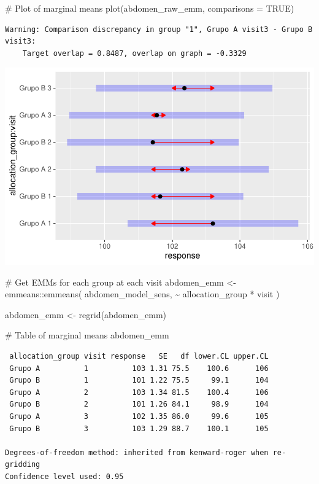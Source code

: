 \documentclass[
  letterpaper,
  DIV=11,
  numbers=noendperiod]{scrartcl}
\newenvironment{Shaded}{\begin{snugshade}}{\end{snugshade}}
\newcommand{\AttributeTok}[1]{\textcolor[rgb]{0.40,0.45,0.13}{#1}}
\newcommand{\CommentTok}[1]{\textcolor[rgb]{0.37,0.37,0.37}{#1}}
\newcommand{\ConstantTok}[1]{\textcolor[rgb]{0.56,0.35,0.01}{#1}}
\newcommand{\FunctionTok}[1]{\textcolor[rgb]{0.28,0.35,0.67}{#1}}
\newcommand{\NormalTok}[1]{\textcolor[rgb]{0.00,0.23,0.31}{#1}}
\newcommand{\OtherTok}[1]{\textcolor[rgb]{0.00,0.23,0.31}{#1}}
\newcommand{\SpecialCharTok}[1]{\textcolor[rgb]{0.37,0.37,0.37}{#1}}
\begin{document}
\begin{Shaded}
\begin{Highlighting}[]
\CommentTok{\# Plot of marginal means}
\FunctionTok{plot}\NormalTok{(abdomen\_raw\_emm, }\AttributeTok{comparisons =} \ConstantTok{TRUE}\NormalTok{)}
\end{Highlighting}
\end{Shaded}

\begin{verbatim}
Warning: Comparison discrepancy in group "1", Grupo A visit3 - Grupo B visit3:
    Target overlap = 0.8487, overlap on graph = -0.3329
\end{verbatim}

\includegraphics{Outcomes_V1V2V3_files/figure-pdf/labs_abdomen_raw_emm-1.pdf}

\begin{Shaded}
\begin{Highlighting}[]
\CommentTok{\# Get EMMs for each group at each visit}
\NormalTok{abdomen\_emm }\OtherTok{\textless{}{-}}\NormalTok{ emmeans}\SpecialCharTok{::}\FunctionTok{emmeans}\NormalTok{(}
\NormalTok{    abdomen\_model\_sens, }
    \SpecialCharTok{\textasciitilde{}}\NormalTok{ allocation\_group }\SpecialCharTok{*}\NormalTok{ visit}
\NormalTok{)}

\NormalTok{abdomen\_emm }\OtherTok{\textless{}{-}} \FunctionTok{regrid}\NormalTok{(abdomen\_emm)}

\CommentTok{\# Table of marginal means}
\NormalTok{abdomen\_emm}
\end{Highlighting}
\end{Shaded}

\begin{verbatim}
 allocation_group visit response   SE   df lower.CL upper.CL
 Grupo A          1          103 1.31 75.5    100.6      106
 Grupo B          1          101 1.22 75.5     99.1      104
 Grupo A          2          103 1.34 81.5    100.4      106
 Grupo B          2          101 1.26 84.1     98.9      104
 Grupo A          3          102 1.35 86.0     99.6      105
 Grupo B          3          103 1.29 88.7    100.1      105

Degrees-of-freedom method: inherited from kenward-roger when re-gridding 
Confidence level used: 0.95 
\end{verbatim}
\end{document}
